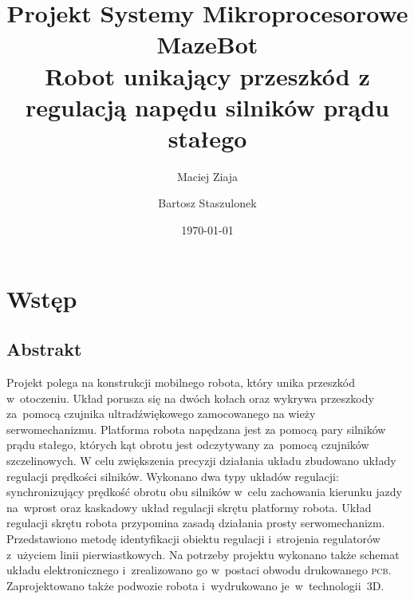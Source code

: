 \documentclass[11pt]{article}
\author{Maciej Ziaja \and Bartosz Staszulonek}
\date{\today}
\begin{document}
\title{
  Projekt Systemy Mikroprocesorowe \\
  \large MazeBot \\
    Robot unikający przeszkód z regulacją napędu silników prądu stałego}

\maketitle

\newpage
{}
\tableofcontents

\section{Wstęp}

\subsection{Abstrakt}
Projekt polega na konstrukcji mobilnego robota, który unika przeszkód w~otoczeniu.
Układ porusza się na dwóch kołach oraz wykrywa przeszkody za~pomocą czujnika ultradźwiękowego zamocowanego na wieży serwomechanizmu.
Platforma robota napędzana jest za pomocą pary silników prądu stałego, których kąt obrotu jest odczytywany za~pomocą czujników szczelinowych.
W celu zwiększenia precyzji działania układu zbudowano układy regulacji prędkości silników.
Wykonano dwa typy układów regulacji: synchronizujący prędkość obrotu obu silników w~celu zachowania kierunku jazdy na~wprost oraz kaskadowy układ regulacji skrętu platformy robota.
Układ regulacji skrętu robota przypomina zasadą działania prosty serwomechanizm.
Przedstawiono metodę identyfikacji obiektu regulacji i~strojenia regulatorów z~użyciem linii pierwiastkowych.
Na potrzeby projektu wykonano także schemat układu elektronicznego i~zrealizowano go w~postaci obwodu drukowanego \textsc{pcb}.
Zaprojektowano także podwozie robota i~wydrukowano je~w~technologii~3D.
\end{document}
